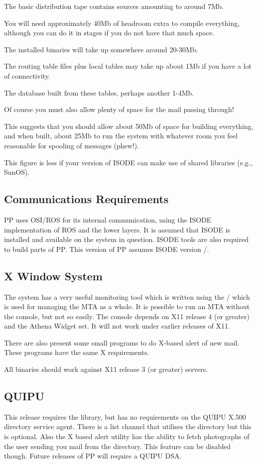 The basic distribution tape contains sources amounting to around 7Mb.

You will need approximately 40Mb of headroom extra to compile
everything, although you can do it in stages if you do not have that
much space.

The installed binaries will take up somewhere around 20-30Mb.

The routing table files plus local tables  may take up about 1Mb if you
have a lot of connectivity.

The  database built from these tables, perhaps another 1-4Mb.

Of course you must also allow plenty of space for the mail passing through!

This suggests that you should allow about 50Mb of space for building
everything, and when built, about 25Mb to run the system with whatever
room you feel reasonable for spooling of messages (phew!).

This figure is less if your version of ISODE can make use of shared
libraries (e.g., SunOS).

\subsection   {Communications Requirements}  

PP uses OSI/ROS for its internal communication, using the ISODE
implementation of ROS and the lower layers\cite{ISODE}. It is assumed
that ISODE is installed and available on the system in question. ISODE
 tools are also required to build parts of PP. This version of
PP assumes ISODE version \isodevrsn/.

\subsection	{X Window System}
The system has a very useful monitoring tool which is written using
the \xwindows/
which is used for managing the MTA as a whole. It is possible to run
an MTA without the console, but not so easily. The console depends on
X11 release 4 (or greater) and the Athena Widget set. It will not work under
earlier releases of X11.

There are also present some small programs to do X-based alert of
new mail. These programs have the same X requirements.

All binaries should work against X11 release 3 (or greater) servers.

\subsection	{QUIPU}
This release requires the  library, but has no
requirements on the QUIPU X.500 directory service agent. There is a
list channel that utilises the directory but this is optional. Also
the X based alert utility has the ability to fetch photographs of the
user sending you mail from the directory. This feature can be disabled
though. Future releases of PP will require a QUIPU DSA.

